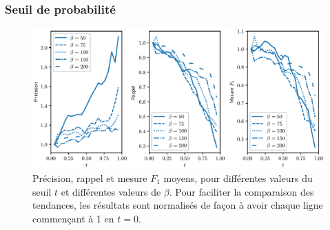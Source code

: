 


\subsubsection{Seuil de probabilité}
\label{subsec:te-hp-threshold}



\begin{figure}[h]
    \centering
    \includegraphics[width=\textwidth]{fig/plot/threshold_breakdown_aggregated.eps}
    \caption[Influence du seuil de probabilité sur l'extraction de taxonomie pour différents $\beta$]{Précision, rappel et mesure $F_1$ moyens, pour différentes valeurs du seuil $t$ et différentes valeurs de $\beta$. Pour faciliter la comparaison des tendances, les résultats sont normalisés de façon à avoir chaque ligne commençant à 1 en $t = 0$.}
    \label{fig:threshold-search-2}
\end{figure}

